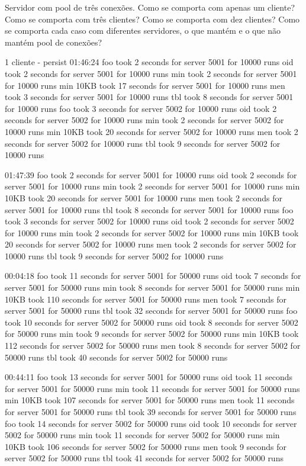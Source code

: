 \documentclass[11pt]{article}
\begin{document}
Servidor com pool de três conexões.
Como se comporta com apenas um cliente?
Como se comporta com três clientes?
Como se comporta com dez clientes?
Como se comporta cada caso com diferentes servidores, o que mantém e o que não
mantém pool de conexões?


 1 cliente - persist
01:46:24
foo took 2 seconds for server 5001 for 10000 runs
oid took 2 seconds for server 5001 for 10000 runs
min took 2 seconds for server 5001 for 10000 runs
min 10KB took 17 seconds for server 5001 for 10000 runs
men took 3 seconds for server 5001 for 10000 runs
tbl took 8 seconds for server 5001 for 10000 runs
foo took 3 seconds for server 5002 for 10000 runs
oid took 2 seconds for server 5002 for 10000 runs
min took 2 seconds for server 5002 for 10000 runs
min 10KB took 20 seconds for server 5002 for 10000 runs
men took 2 seconds for server 5002 for 10000 runs
tbl took 9 seconds for server 5002 for 10000 runs

01:47:39
foo took 2 seconds for server 5001 for 10000 runs
oid took 2 seconds for server 5001 for 10000 runs
min took 2 seconds for server 5001 for 10000 runs
min 10KB took 20 seconds for server 5001 for 10000 runs
men took 2 seconds for server 5001 for 10000 runs
tbl took 8 seconds for server 5001 for 10000 runs
foo took 3 seconds for server 5002 for 10000 runs
oid took 2 seconds for server 5002 for 10000 runs
min took 2 seconds for server 5002 for 10000 runs
min 10KB took 20 seconds for server 5002 for 10000 runs
men took 2 seconds for server 5002 for 10000 runs
tbl took 9 seconds for server 5002 for 10000 runs


00:04:18
foo took 11 seconds for server 5001 for 50000 runs
oid took 7 seconds for server 5001 for 50000 runs
min took 8 seconds for server 5001 for 50000 runs
min 10KB took 110 seconds for server 5001 for 50000 runs
men took 7 seconds for server 5001 for 50000 runs
tbl took 32 seconds for server 5001 for 50000 runs
foo took 10 seconds for server 5002 for 50000 runs
oid took 8 seconds for server 5002 for 50000 runs
min took 9 seconds for server 5002 for 50000 runs
min 10KB took 112 seconds for server 5002 for 50000 runs
men took 8 seconds for server 5002 for 50000 runs
tbl took 40 seconds for server 5002 for 50000 runs

00:44:11
foo took 13 seconds for server 5001 for 50000 runs
oid took 11 seconds for server 5001 for 50000 runs
min took 11 seconds for server 5001 for 50000 runs
min 10KB took 107 seconds for server 5001 for 50000 runs
men took 11 seconds for server 5001 for 50000 runs
tbl took 39 seconds for server 5001 for 50000 runs
foo took 14 seconds for server 5002 for 50000 runs
oid took 10 seconds for server 5002 for 50000 runs
min took 11 seconds for server 5002 for 50000 runs
min 10KB took 106 seconds for server 5002 for 50000 runs
men took 9 seconds for server 5002 for 50000 runs
tbl took 41 seconds for server 5002 for 50000 runs
\end{document}
